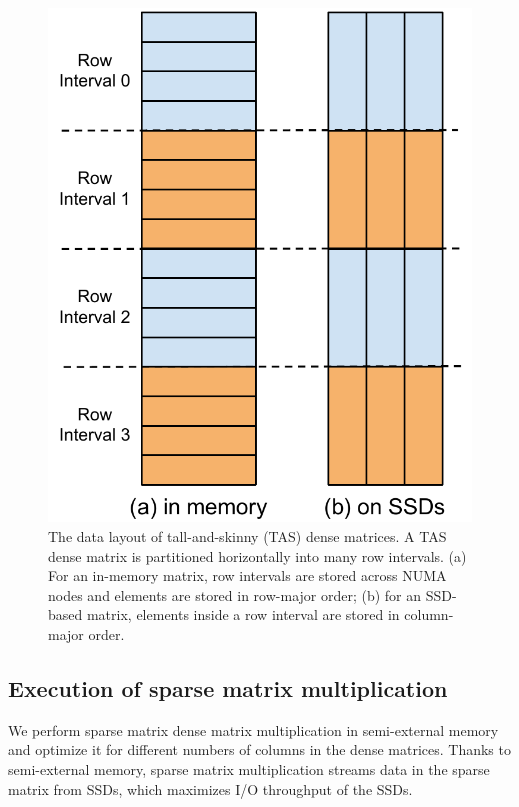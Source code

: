 \begin{figure}
\centering
\includegraphics[scale=0.4]{./dense_matrix.pdf}
\caption{The data layout of tall-and-skinny (TAS) dense matrices. A TAS
dense matrix is partitioned horizontally into many row intervals.
(a) For an in-memory matrix, row intervals are stored across NUMA nodes and
elements are stored in row-major order; (b) for an SSD-based matrix, elements
inside a row interval are stored in column-major order.}
\label{dense_mat}
\end{figure}

\subsection{Execution of sparse matrix multiplication} \label{sec:exec}
We perform sparse matrix dense matrix multiplication in semi-external memory
and optimize it for different numbers of columns in the dense matrices.
Thanks to semi-external memory, sparse matrix multiplication streams data
in the sparse matrix from SSDs, which maximizes I/O throughput of the SSDs.

